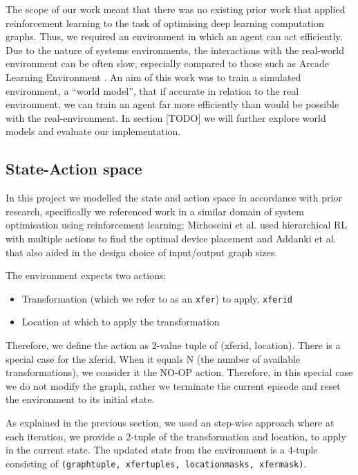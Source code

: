 The scope of our work meant that there was no existing prior work that applied reinforcement learning to the task of optimising deep learning computation graphs. Thus, we required an environment in which an agent can act efficiently. Due to the nature of systems environments, the interactions with the real-world environment can be often slow, especially compared to those such as Arcade Learning Environment \cite{Bellemare_2013}. An aim of this work was to train a simulated environment, a ``world model'', that if accurate in relation to the real environment, we can train an agent far more efficiently than would be possible with the real-environment. In section [TODO] we will further explore world models and evaluate our implementation.

\subsection{State-Action space}
In this project we modelled the state and action space in accordance with prior research, specifically we referenced work in a similar domain of system optimisation using reinforcement learning; Mirhoseini et al. \cite{mirhoseini2018hierarchical} used hierarchical RL with multiple actions to find the optimal device placement and Addanki et al. \cite{addanki2019placeto} that also aided in the design choice of input/output graph sizes.

The environment expects two actions: 
\begin{itemize}
  \item Transformation (which we refer to as an \texttt{xfer}) to apply, \texttt{xfer\textunderscore id}
  \item Location at which to apply the transformation
\end{itemize}
Therefore, we define the action as 2-value tuple of (xfer\textunderscore id, location). There is a special case for the xfer\textunderscore id. When it equals N (the number of available transformations), we consider it the NO-OP action. Therefore, in this special case we do not modify the graph, rather we terminate the current episode and reset the environment to its initial state.

As explained in the previous section, we used an step-wise approach where at each iteration, we provide a 2-tuple of the transformation and location, to apply in the current state. The updated state from the environment is a 4-tuple consisting of \texttt{(graph\textunderscore tuple, xfer\textunderscore tuples, location\textunderscore masks, xfer\textunderscore mask)}.

